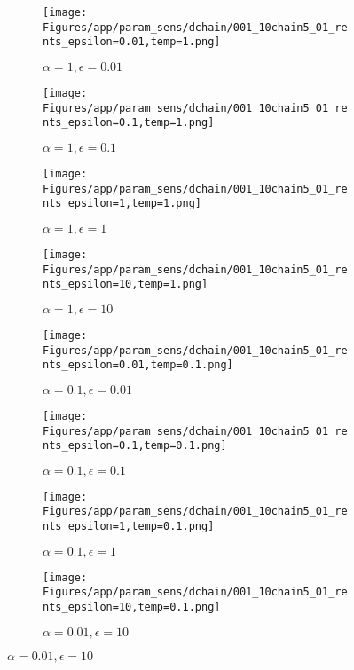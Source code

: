 \documentclass{article}
\theoremstyle{plain}
\begin{document}
\begin{appendices}
\begin{figure}
                \begin{subfigure}[b]{0.24\textwidth}
                    \centering
                    \texttt{[image: Figures/app/param\_sens/dchain/001\_10chain5\_01\_rents\_epsilon=0.01,temp=1.png]}
                    \caption*{$\alpha=1,\epsilon=0.01$}
                \end{subfigure}
                \begin{subfigure}[b]{0.24\textwidth}
                    \centering
                    \texttt{[image: Figures/app/param\_sens/dchain/001\_10chain5\_01\_rents\_epsilon=0.1,temp=1.png]}
                    \caption*{$\alpha=1,\epsilon=0.1$}
                \end{subfigure}
                \begin{subfigure}[b]{0.24\textwidth}
                    \centering
                    \texttt{[image: Figures/app/param\_sens/dchain/001\_10chain5\_01\_rents\_epsilon=1,temp=1.png]}
                    \caption*{$\alpha=1,\epsilon=1$}
                \end{subfigure}
                \begin{subfigure}[b]{0.24\textwidth}
                    \centering
                    \texttt{[image: Figures/app/param\_sens/dchain/001\_10chain5\_01\_rents\_epsilon=10,temp=1.png]}
                    \caption*{$\alpha=1,\epsilon=10$}
                \end{subfigure}
                
                \begin{subfigure}[b]{0.24\textwidth}
                    \centering
                    \texttt{[image: Figures/app/param\_sens/dchain/001\_10chain5\_01\_rents\_epsilon=0.01,temp=0.1.png]}
                    \caption*{$\alpha=0.1,\epsilon=0.01$}
                \end{subfigure}
                \begin{subfigure}[b]{0.24\textwidth}
                    \centering
                    \texttt{[image: Figures/app/param\_sens/dchain/001\_10chain5\_01\_rents\_epsilon=0.1,temp=0.1.png]}
                    \caption*{$\alpha=0.1,\epsilon=0.1$}
                \end{subfigure}
                \begin{subfigure}[b]{0.24\textwidth}
                    \centering
                    \texttt{[image: Figures/app/param\_sens/dchain/001\_10chain5\_01\_rents\_epsilon=1,temp=0.1.png]}
                    \caption*{$\alpha=0.1,\epsilon=1$}
                \end{subfigure}
                \begin{subfigure}[b]{0.24\textwidth}
                    \centering
                    \texttt{[image: Figures/app/param\_sens/dchain/001\_10chain5\_01\_rents\_epsilon=10,temp=0.1.png]}
                    \caption*{$\alpha=0.01,\epsilon=10$}
                \end{subfigure}
                

\end{figure}
\end{appendices}
\end{document}
